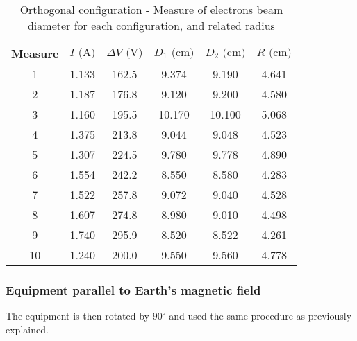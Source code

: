 \begin{table}[!htbp]
    {\par\centering
    \begin{tabular}{cccccc}
        \hline
        Measure & $I \text{ (A)}$ & $\Delta V \text{ (V)}$ & $D_1 \text{ (cm)}$ & $D_2 \text{ (cm)}$ & $R \text{ (cm)}$\\
        \hline
        1   &   1.133&   162.5&   9.374&   9.190& 4.641\\
        2   &   1.187&   176.8&   9.120&   9.200& 4.580\\
        3   &   1.160&   195.5&  10.170&  10.100& 5.068\\
        4   &   1.375&   213.8&   9.044&   9.048& 4.523\\
        5   &   1.307&   224.5&   9.780&   9.778& 4.890\\
        6   &   1.554&   242.2&   8.550&   8.580& 4.283\\
        7   &   1.522&   257.8&   9.072&   9.040& 4.528\\
        8   &   1.607&   274.8&   8.980&   9.010& 4.498\\
        9   &   1.740&   295.9&   8.520&   8.522& 4.261\\
        10  &   1.240&   200.0&   9.550&   9.560& 4.778\\
        \hline
    \end{tabular}
    \par}
    \caption{Orthogonal configuration - Measure of electrons beam diameter for each configuration, and related radius}
\end{table}

\subsubsection{Equipment parallel to Earth's magnetic field}
The equipment is then rotated by $90^{\circ}$ and used the same procedure as previously explained.

